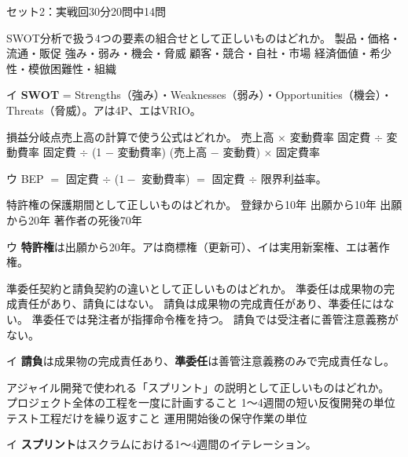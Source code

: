 
\begin{mogishi}{セット2：実戦回}{30分}{20問中14問}

\begin{itpmon}[\diffbadge{標}]{SWOT分析で扱う4つの要素の組合せとして正しいものはどれか。}
\sentakushi
  {製品・価格・流通・販促}
  {強み・弱み・機会・脅威}
  {顧客・競合・自社・市場}
  {経済価値・希少性・模倣困難性・組織}
\end{itpmon}
\begin{kaisetsu}{イ}
\textbf{SWOT} = Strengths（強み）・Weaknesses（弱み）・Opportunities（機会）・Threats（脅威）。アは4P、エはVRIO。
\end{kaisetsu}

\begin{itpmon}[\diffbadge{標}]{損益分岐点売上高の計算で使う公式はどれか。}
\sentakushi
  {売上高 $\times$ 変動費率}
  {固定費 $\div$ 変動費率}
  {固定費 $\div$ (1 $-$ 変動費率)}
  {(売上高 $-$ 変動費) $\times$ 固定費率}
\end{itpmon}
\begin{kaisetsu}{ウ}
BEP $=$ 固定費 $\div$ ($1 -$ 変動費率) $=$ 固定費 $\div$ 限界利益率。
\end{kaisetsu}

\begin{itpmon}[\diffbadge{標}]{特許権の保護期間として正しいものはどれか。}
\sentakushi
  {登録から10年}
  {出願から10年}
  {出願から20年}
  {著作者の死後70年}
\end{itpmon}
\begin{kaisetsu}{ウ}
\textbf{特許権}は出願から20年。アは商標権（更新可）、イは実用新案権、エは著作権。
\end{kaisetsu}

\begin{itpmon}[\diffbadge{強}]{準委任契約と請負契約の違いとして正しいものはどれか。}
\sentakushi
  {準委任は成果物の完成責任があり、請負にはない。}
  {請負は成果物の完成責任があり、準委任にはない。}
  {準委任では発注者が指揮命令権を持つ。}
  {請負では受注者に善管注意義務がない。}
\end{itpmon}
\begin{kaisetsu}{イ}
\textbf{請負}は成果物の完成責任あり、\textbf{準委任}は善管注意義務のみで完成責任なし。
\end{kaisetsu}

\begin{itpmon}[\diffbadge{標}]{アジャイル開発で使われる「スプリント」の説明として正しいものはどれか。}
\sentakushi
  {プロジェクト全体の工程を一度に計画すること}
  {1〜4週間の短い反復開発の単位}
  {テスト工程だけを繰り返すこと}
  {運用開始後の保守作業の単位}
\end{itpmon}
\begin{kaisetsu}{イ}
\textbf{スプリント}はスクラムにおける1〜4週間のイテレーション。
\end{kaisetsu}


\end{mogishi}
